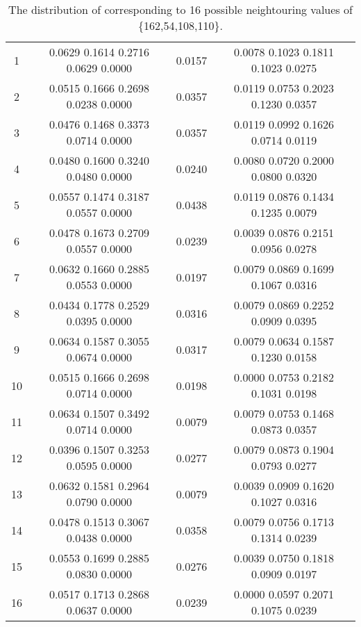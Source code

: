 \documentclass[twocolumn]{svjour3}
\begin{document}
\begin{table*}[!htp]
\center\caption{The distribution of  corresponding to 16 possible neightouring values of \{162,54,108,110\}.}
\begin{tabular}{c|c|c|c}
  \hline        &         &  &    \\
  \hline   1  &  0.0629 0.1614 0.2716 0.0629 0.0000 &0.0157 &0.0078 0.1023 0.1811 0.1023 0.0275  \\
  \hline   2  &  0.0515 0.1666 0.2698 0.0238 0.0000 &0.0357 &0.0119 0.0753 0.2023 0.1230 0.0357  \\
  \hline   3  &  0.0476 0.1468 0.3373 0.0714 0.0000 &0.0357 &0.0119 0.0992 0.1626 0.0714 0.0119  \\\hline
  \hline   4  &  0.0480 0.1600 0.3240 0.0480 0.0000 &0.0240 &0.0080 0.0720 0.2000 0.0800 0.0320  \\
  \hline   5  &  0.0557 0.1474 0.3187 0.0557 0.0000 &0.0438 &0.0119 0.0876 0.1434 0.1235 0.0079  \\
  \hline   6  &  0.0478 0.1673 0.2709 0.0557 0.0000 &0.0239 &0.0039 0.0876 0.2151 0.0956 0.0278  \\
  \hline   7  &  0.0632 0.1660 0.2885 0.0553 0.0000 &0.0197 &0.0079 0.0869 0.1699 0.1067 0.0316  \\
  \hline   8  &  0.0434 0.1778 0.2529 0.0395 0.0000 &0.0316 &0.0079 0.0869 0.2252 0.0909 0.0395  \\
  \hline   9  &  0.0634 0.1587 0.3055 0.0674 0.0000 &0.0317 &0.0079 0.0634 0.1587 0.1230 0.0158  \\
  \hline   10 &  0.0515 0.1666 0.2698 0.0714 0.0000 &0.0198 &0.0000 0.0753 0.2182 0.1031 0.0198  \\
  \hline   11 &  0.0634 0.1507 0.3492 0.0714 0.0000 &0.0079 &0.0079 0.0753 0.1468 0.0873 0.0357   \\
  \hline   12 &  0.0396 0.1507 0.3253 0.0595 0.0000 &0.0277 &0.0079 0.0873 0.1904 0.0793 0.0277   \\
  \hline   13 &  0.0632 0.1581 0.2964 0.0790 0.0000 &0.0079 &0.0039 0.0909 0.1620 0.1027 0.0316   \\
  \hline   14 &  0.0478 0.1513 0.3067 0.0438 0.0000 &0.0358 &0.0079 0.0756 0.1713 0.1314 0.0239   \\
  \hline   15 &  0.0553 0.1699 0.2885 0.0830 0.0000 &0.0276 &0.0039 0.0750 0.1818 0.0909 0.0197   \\
  \hline   16 &  0.0517 0.1713 0.2868 0.0637 0.0000 &0.0239 &0.0000 0.0597 0.2071 0.1075 0.0239   \\
  \hline
\end{tabular}
\label{table:result}
\end{table*}
\end{document}
